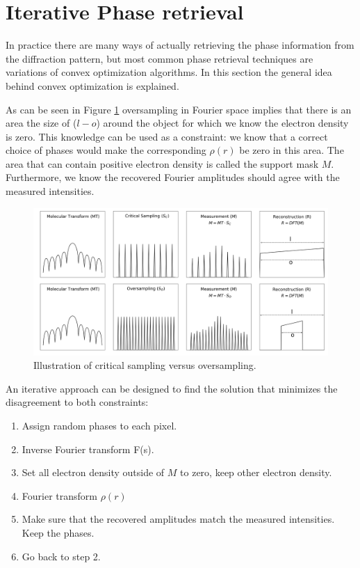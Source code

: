 \section{Iterative Phase retrieval}
In practice there are many ways of actually retrieving the phase information from the diffraction pattern, but most common phase retrieval techniques are variations of convex optimization algorithms. In this section the general idea behind convex optimization is explained.

As can be seen in Figure \ref{fig:sampling} oversampling in Fourier space implies that there is an area the size of ($l-o$) around the object for which we know the electron density is zero. This knowledge can be used as a constraint: we know that a correct choice of phases would make the corresponding $\rho(r)$ be zero in this area. The area that can contain positive electron density is called the support mask $M$. Furthermore, we know the recovered Fourier amplitudes should agree with the measured intensities. 
\begin{figure}[h]
	\centering 
		\includegraphics[width=120mm]{sampling.png}
	\caption{Illustration of critical sampling versus 		oversampling.}
	\label{fig:sampling}
\end{figure}

An iterative approach can be designed to find the solution that minimizes the disagreement to both constraints:\\


\begin{enumerate}
\item Assign random phases to each pixel.
\item Inverse Fourier transform F(s).
\item Set all electron density outside of $M$ to zero, keep other electron density.
\item Fourier transform $\rho(r)$
\item Make sure that the recovered amplitudes match the measured intensities. Keep the phases.
\item Go back to step 2.
\end{enumerate}


